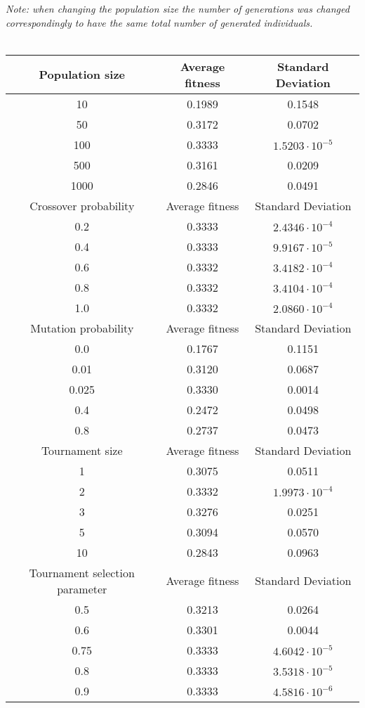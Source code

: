 \documentclass{article}
\begin{document}
\emph{Note: when changing the population size the number of generations was changed correspondingly to have the same total number of generated individuals.}\\\\
\begin{tabular}{c | c | c}
  Population size & Average fitness & Standard Deviation\\
  \hline
  10 & 0.1989 & 0.1548\\
  50 & 0.3172 & 0.0702\\
  100 & 0.3333 & $1.5203\cdot10^{-5}$\\
  500 & 0.3161 & 0.0209\\
  1000 & 0.2846 & 0.0491\\
  \hline
  Crossover probability & Average fitness & Standard Deviation\\
  \hline
  0.2 & 0.3333 & $2.4346\cdot10^{-4}$\\
  0.4 & 0.3333 & $9.9167\cdot10^{-5}$\\
  0.6 & 0.3332 & $3.4182\cdot10^{-4}$\\
  0.8 & 0.3332 & $3.4104\cdot10^{-4}$\\
  1.0 & 0.3332 & $2.0860\cdot10^{-4}$\\
  \hline
  Mutation probability & Average fitness & Standard Deviation\\
  \hline
  0.0 & 0.1767 & 0.1151\\
  0.01 & 0.3120 & 0.0687\\
  0.025 & 0.3330 & 0.0014\\
  0.4 & 0.2472 & 0.0498\\
  0.8 & 0.2737 & 0.0473\\
  \hline
  Tournament size & Average fitness & Standard Deviation\\
  \hline
  1 & 0.3075 & 0.0511\\
  2 & 0.3332 & $1.9973\cdot10^{-4}$\\
  3 & 0.3276 & 0.0251\\
  5 & 0.3094 & 0.0570\\
  10 & 0.2843 & 0.0963\\
  \hline
  Tournament selection parameter & Average fitness & Standard Deviation\\
  \hline
  0.5 & 0.3213 & 0.0264\\
  0.6 & 0.3301 & 0.0044\\
  0.75 & 0.3333 & $4.6042\cdot10^{-5}$\\
  0.8 & 0.3333 & $3.5318\cdot10^{-5}$\\
  0.9 & 0.3333 & $4.5816\cdot10^{-6}$\\
\end{tabular}\\\\
\end{document}
